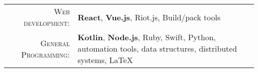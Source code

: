 %
%
%

\begin{tabular}{rl}
    \textsc{Web development:} & \textbf{React}, \textbf{Vue.js}, Riot.js, Build/pack tools \\
    \textsc{General Programming:} & \textbf{Kotlin}, \textbf{Node.js}, Ruby, Swift, Python, automation tools, data structures, distributed systems, LaTeX \\
\end{tabular}
